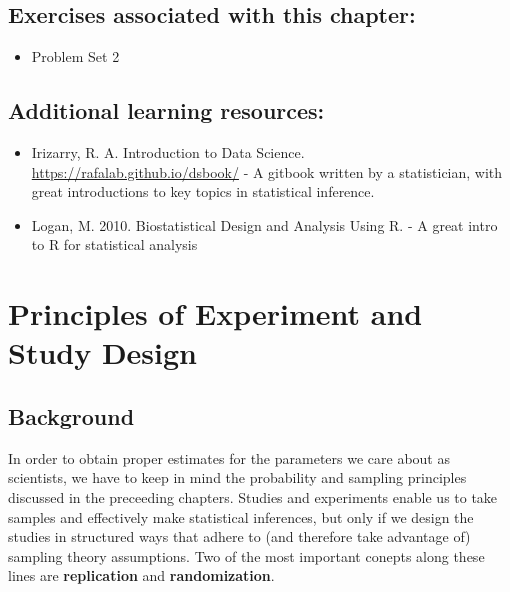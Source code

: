 \documentclass[]{book}
\providecommand{\tightlist}{%
  \setlength{\itemsep}{0pt}\setlength{\parskip}{0pt}}
\begin{document}
\hypertarget{exercises-associated-with-this-chapter-4}{%
\section{Exercises associated with this chapter:}\label{exercises-associated-with-this-chapter-4}}

\begin{itemize}
\tightlist
\item
  Problem Set 2
\end{itemize}

\hypertarget{additional-learning-resources-4}{%
\section{Additional learning resources:}\label{additional-learning-resources-4}}

\begin{itemize}
\item
  Irizarry, R. A. Introduction to Data Science. \url{https://rafalab.github.io/dsbook/} - A gitbook written by a statistician, with great introductions to key topics in statistical inference.
\item
  Logan, M. 2010. Biostatistical Design and Analysis Using R. - A great intro to R for statistical analysis
\end{itemize}

\hypertarget{principles-of-experiment-and-study-design}{%
\chapter{Principles of Experiment and Study Design}\label{principles-of-experiment-and-study-design}}

\hypertarget{background-4}{%
\section{Background}\label{background-4}}

In order to obtain proper estimates for the parameters we care about as scientists, we have to keep in mind the probability and sampling principles discussed in the preceeding chapters. Studies and experiments enable us to take samples and effectively make statistical inferences, but only if we design the studies in structured ways that adhere to (and therefore take advantage of) sampling theory assumptions. Two of the most important conepts along these lines are \textbf{replication} and \textbf{randomization}.
\end{document}
